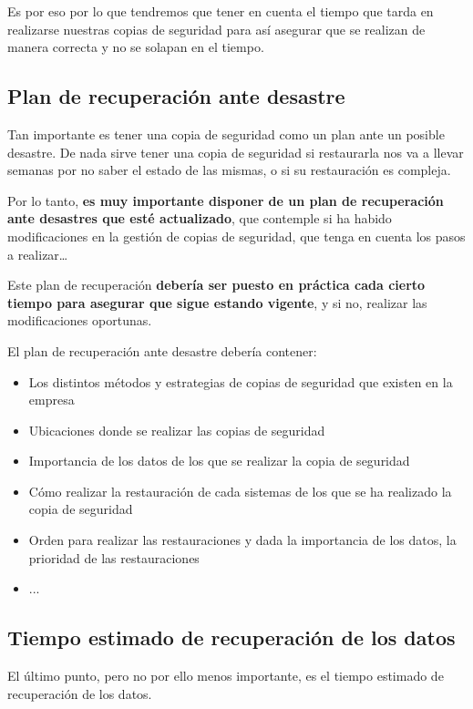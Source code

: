Es por eso por lo que tendremos que tener en cuenta el tiempo que tarda en realizarse nuestras copias de seguridad para así asegurar que se realizan de manera correcta y no se solapan en el tiempo.


\subsection{Plan de recuperación ante desastre}
Tan importante es tener una copia de seguridad como un plan ante un posible desastre. De nada sirve tener una copia de seguridad si restaurarla nos va a llevar semanas por no saber el estado de las mismas, o si su restauración es compleja.

Por lo tanto, \textbf{es muy importante disponer de un plan de recuperación ante desastres que esté actualizado}, que contemple si ha habido modificaciones en la gestión de copias de seguridad, que tenga en cuenta los pasos a realizar…

Este plan de recuperación \textbf{debería ser puesto en práctica cada cierto tiempo para asegurar que sigue estando vigente}, y si no, realizar las modificaciones oportunas.


El plan de recuperación ante desastre debería contener:
\begin{itemize}
    \item Los distintos métodos y estrategias de copias de seguridad que existen en la empresa
    \item Ubicaciones donde se realizar las copias de seguridad
    \item Importancia de los datos de los que se realizar la copia de seguridad
    \item Cómo realizar la restauración de cada sistemas de los que se ha realizado la copia de seguridad
    \item Orden para realizar las restauraciones y dada la importancia de los datos, la prioridad de las restauraciones
    \item ...
\end{itemize}


\subsection{Tiempo estimado de recuperación de los datos}
El último punto, pero no por ello menos importante, es el tiempo estimado de recuperación de los datos.

